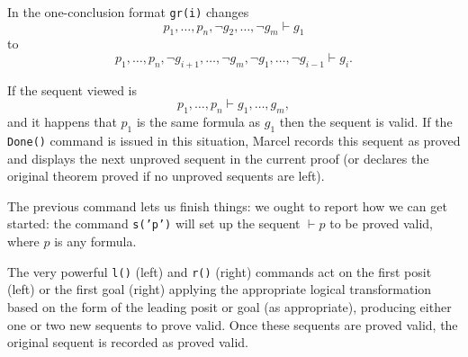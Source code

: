 \documentclass[12pt]{book}
\begin{document}
In the one-conclusion format {\tt gr(i)} changes $$p_1,\ldots,p_n,\neg g_2,\ldots,\neg g_m \vdash g_1$$ to $$p_1,\ldots,p_n,\neg g_{i+1},\ldots,\neg g_m,\neg g_1,\ldots,\neg g_{i-1} \vdash g_i.$$

If the sequent viewed is $$p_1, \ldots, p_n \vdash g_1,\ldots,g_m,$$ and it happens that $p_1$ is the same formula as $g_1$ then the sequent is valid.
If the {\tt Done()} command is issued in this situation, Marcel records this sequent as proved and displays the next unproved sequent in the current proof (or declares the original theorem proved if no unproved sequents are left).

The previous command lets us finish things:  we ought to report how we can get started:  the command {\tt s('p')} will set up the sequent
$\vdash p$ to be proved valid, where $p$ is any formula.

The very powerful {\tt l()} (left) and {\tt r()} (right) commands act on the first posit (left) or the first goal (right) applying the appropriate logical transformation based on the form of the leading posit or goal (as appropriate), producing either one or two new sequents to prove valid.  Once these sequents are proved valid, the original sequent is recorded as proved valid.
\end{document}
